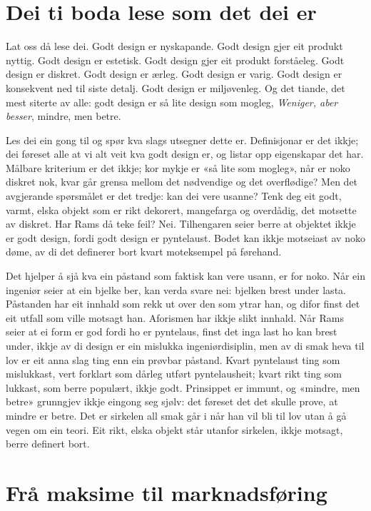 \section{Dei ti boda lese som det dei er}

Lat oss då lese dei. Godt design er nyskapande. Godt design gjer eit produkt nyttig. Godt design er estetisk. Godt design gjer eit produkt forståeleg. Godt design er diskret. Godt design er ærleg. Godt design er varig. Godt design er konsekvent ned til siste detalj. Godt design er miljøvenleg. Og det tiande, det mest siterte av alle: godt design er så lite design som mogleg, \textit{Weniger, aber besser}, mindre, men betre.

Les dei ein gong til og spør kva slags utsegner dette er. Definisjonar er det ikkje; dei føreset alle at vi alt veit kva godt design er, og listar opp eigenskapar det har. Målbare kriterium er det ikkje; kor mykje er «så lite som mogleg», når er noko diskret nok, kvar går grensa mellom det nødvendige og det overflødige? Men det avgjerande spørsmålet er det tredje: kan dei vere usanne? Tenk deg eit godt, varmt, elska objekt som er rikt dekorert, mangefarga og overdådig, det motsette av diskret. Har Rams då teke feil? Nei. Tilhengaren seier berre at objektet ikkje er godt design, fordi godt design er pyntelaust. Bodet kan ikkje motseiast av noko døme, av di det definerer bort kvart moteksempel på førehand.

Det hjelper å sjå kva ein påstand som faktisk kan vere usann, er for noko. Når ein ingeniør seier at ein bjelke ber, kan verda svare nei: bjelken brest under lasta. Påstanden har eit innhald som rekk ut over den som ytrar han, og difor finst det eit utfall som ville motsagt han. Aforismen har ikkje slikt innhald. Når Rams seier at ei form er god fordi ho er pyntelaus, finst det inga last ho kan brest under, ikkje av di design er ein mislukka ingeniørdisiplin, men av di smak heva til lov er eit anna slag ting enn ein prøvbar påstand. Kvart pyntelaust ting som mislukkast, vert forklart som dårleg utført pyntelausheit; kvart rikt ting som lukkast, som berre populært, ikkje godt. Prinsippet er immunt, og «mindre, men betre» grunngjev ikkje eingong seg sjølv: det føreset det det skulle prove, at mindre er betre. Det er sirkelen all smak går i når han vil bli til lov utan å gå vegen om ein teori. Eit rikt, elska objekt står utanfor sirkelen, ikkje motsagt, berre definert bort.

\section{Frå maksime til marknadsføring}

